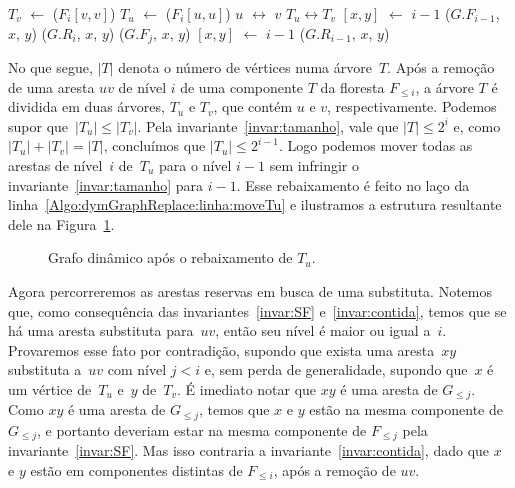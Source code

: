 \begin{algorithm}
\caption{\dymGraphReplace($G$, $u$, $v$, $niv$)}
\label{Algo:dymGraphReplace}
\begin{algorithmic}[1]
\label{Algo:dymGraphReplace:linha:primeira}
\State $T_v$ $\gets$  \treapGetRoot($F_i[v,v]$)
\State $T_u$ $\gets$  \treapGetRoot($F_i[u,u]$)
\State $u$ $\leftrightarrow$ $v$
\State $T_u \leftrightarrow T_v$
\EndIf
{}\label{Algo:dymGraphReplace:linha:moveTu}
\State \nivel$[x,y]$ $\gets$ $i-1$
\State \dymForestAddEdge($G$.$F_{i-1}$, $x$, $y$) 
\EndFor
{}\label{Algo:dymGraphReplace:linha:achaSub}
\State \graphDel($G$.$R_i$, $x$, $y$)
\label{Algo:dymGraphReplace:linha:inseresub}
\State \dymForestAddEdge($G$.$F_j$, $x$, $y$)
\EndFor
\State \Return
\Else
\State \nivel$[x,y]$ $\gets$ $i-1$
\State \graphAdd($G$.$R_{i-1}$, $x$, $y$)
\EndIf
\EndFor
\EndFor\label{Algo:dymGraphReplace:linha:ultima}
\end{algorithmic}
\end{algorithm}


No que segue, $|T|$ denota o número de vértices numa árvore~$T$.
Após a remoção de uma aresta $uv$ de nível $i$ de uma componente $T$ da floresta $F_{\leqslant i}$, a árvore $T$ é dividida em duas árvores, $T_u$ e $T_v$, que contém $u$ e $v$, respectivamente. Podemos supor que~$|T_u|\leqslant |T_v|$. Pela invariante~\ref{invar:tamanho}, vale que $|T| \leq 2^i$ e, como ${|T_u| + |T_v| = |T|}$, concluímos que $|T_u| \leq 2^{i-1}$. Logo podemos mover todas as arestas de nível~$i$ de~$T_u$ para o nível $i-1$ sem infringir o invariante~\ref{invar:tamanho} para $i-1$.  Esse rebaixamento é feito no laço da linha~\ref{Algo:dymGraphReplace:linha:moveTu} e ilustramos a estrutura resultante dele na Figura~\ref{fig:DG-depois-de-rebaixar}.

\begin{figure}[htb]
\centering
\caption{Grafo dinâmico após o rebaixamento de $T_u$.}
\label{fig:DG-depois-de-rebaixar}
\end{figure}

Agora percorreremos as arestas reservas em busca de uma substituta. Notemos que, como consequência das invariantes~\ref{invar:SF} e~\ref{invar:contida}, temos que se há uma aresta substituta para~$uv$, então seu nível é maior ou igual a~$i$. Provaremos esse fato por contradição, supondo que exista uma aresta~$xy$ substituta a~$uv$ com nível $j<i$ e, sem perda de generalidade, supondo que~$x$ é um vértice de~$T_u$ e~$y$ de~$T_v$. É imediato notar que $xy$ é uma aresta de $G_{\leqslant j}$. Como $xy$ é uma aresta de $G_{\leqslant j}$, temos que $x$ e $y$ estão na mesma componente de $G_{\leqslant j}$, e portanto deveriam estar na mesma componente de $F_{\leqslant j}$ pela invariante~\ref{invar:SF}. Mas isso contraria a invariante~\ref{invar:contida}, dado que $x$ e $y$ estão em componentes distintas de $F_{\leqslant i}$, após a remoção de $uv$.

